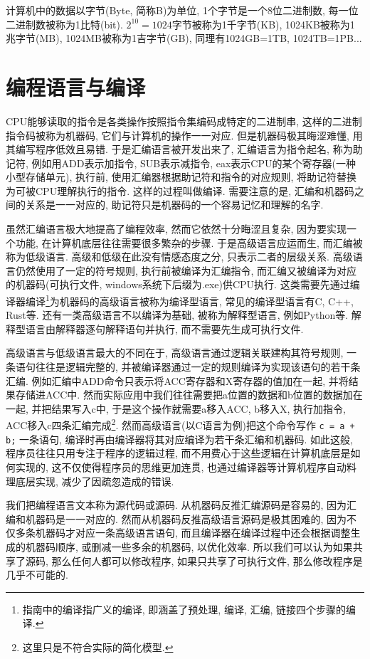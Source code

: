         计算机中的数据以字节(Byte, 简称B)为单位, 1个字节是一个8位二进制数, 每一位二进制数被称为1比特(bit). $ 2^{10} = 1024 $字节被称为1千字节(KB), 1024KB被称为1兆字节(MB), 1024MB被称为1吉字节(GB), 同理有1024GB=1TB, 1024TB=1PB...

    \section{编程语言与编译} \label{编程语言与编译}
        CPU能够读取的指令是各类操作按照指令集编码成特定的二进制串, 这样的二进制指令码被称为机器码, 它们与计算机的操作一一对应. 但是机器码极其晦涩难懂, 用其编写程序低效且易错. 于是汇编语言被开发出来了, 汇编语言为指令起名, 称为助记符, 例如用ADD表示加指令, SUB表示减指令, eax表示CPU的某个寄存器(一种小型存储单元), 执行前, 使用汇编器根据助记符和指令的对应规则, 将助记符替换为可被CPU理解执行的指令. 这样的过程叫做编译. 需要注意的是, 汇编和机器码之间的关系是一一对应的, 助记符只是机器码的一个容易记忆和理解的名字.

        虽然汇编语言极大地提高了编程效率, 然而它依然十分晦涩且复杂, 因为要实现一个功能, 在计算机底层往往需要很多繁杂的步骤. 于是高级语言应运而生, 而汇编被称为低级语言. 高级和低级在此没有情感态度之分, 只表示二者的层级关系. 高级语言仍然使用了一定的符号规则, 执行前被编译为汇编指令, 而汇编又被编译为对应的机器码(可执行文件, windows系统下后缀为.exe)供CPU执行. 这类需要先通过编译器编译\footnote{指南中的编译指广义的编译, 即涵盖了预处理, 编译, 汇编, 链接四个步骤的编译.}为机器码的高级语言被称为编译型语言, 常见的编译型语言有C, C++, Rust等. 还有一类高级语言不以编译为基础, 被称为解释型语言, 例如Python等. 解释型语言由解释器逐句解释语句并执行, 而不需要先生成可执行文件.
        
        高级语言与低级语言最大的不同在于, 高级语言通过逻辑关联建构其符号规则, 一条语句往往是逻辑完整的, 并被编译器通过一定的规则编译为实现该语句的若干条汇编. 例如汇编中ADD命令只表示将ACC寄存器和X寄存器的值加在一起, 并将结果存储进ACC中. 然而实际应用中我们往往需要把a位置的数据和b位置的数据加在一起, 并把结果写入c中, 于是这个操作就需要a移入ACC, b移入X, 执行加指令, ACC移入c四条汇编完成\footnote{这里只是不符合实际的简化模型.}. 然而高级语言(以C语言为例)把这个命令写作 \texttt{c = a + b;} 一条语句, 编译时再由编译器将其对应编译为若干条汇编和机器码. 如此这般, 程序员往往只用专注于程序的逻辑过程, 而不用费心于这些逻辑在计算机底层是如何实现的, 这不仅使得程序员的思维更加连贯, 也通过编译器等计算机程序自动料理底层实现, 减少了因疏忽造成的错误.

        我们把编程语言文本称为源代码或源码. 从机器码反推汇编源码是容易的, 因为汇编和机器码是一一对应的. 然而从机器码反推高级语言源码是极其困难的, 因为不仅多条机器码才对应一条高级语言语句, 而且编译器在编译过程中还会根据调整生成的机器码顺序, 或删减一些多余的机器码, 以优化效率. 所以我们可以认为如果共享了源码, 那么任何人都可以修改程序, 如果只共享了可执行文件, 那么修改程序是几乎不可能的. 
        
